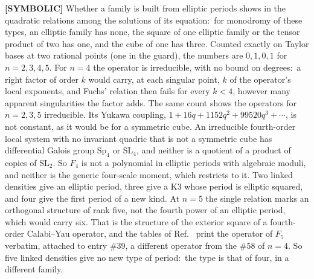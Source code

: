 \documentclass[aps,pra,twocolumn,superscriptaddress,longbibliography]{revtex4-2}
\begin{document}
\textbf{[SYMBOLIC]} Whether a family is built from elliptic periods shows
in the quadratic relations among the solutions of its equation:\ for
monodromy of these types, an elliptic family has none, the square of
one elliptic family or the tensor product of two has one, and the cube of
one has three.  Counted
exactly on Taylor bases at two rational points (one in the guard), the
numbers are
$0,1,0,1$ for $n=2,3,4,5$.  For $n=4$ the operator is irreducible, with
no bound on degrees:\ a right factor of order $k$ would carry, at each
singular point, $k$ of the operator's local exponents, and Fuchs' relation
then fails for every $k<4$, however many apparent singularities the factor
adds.  The same count shows the operators for $n=2,3,5$ irreducible.  Its
Yukawa coupling,
$1+16q+1152q^2+99520q^3+\cdots$, is not constant, as it would be for a
symmetric cube.  An irreducible fourth-order local system with no invariant
quadric that is not a symmetric cube has differential Galois group $\mathrm{Sp}_4$ or $\mathrm{SL}_4$,
and neither is a quotient of a product of copies of $\mathrm{SL}_2$.  So
$F_4$ is not a polynomial in elliptic periods with algebraic moduli, and
neither is the generic four-scale moment, which restricts to it.  Two
linked densities give an elliptic period, three give a K3 whose period is
elliptic squared, and four give the first period of a new kind.  At $n=5$
the single relation marks an orthogonal structure of rank five, not the
fourth power of an elliptic period, which would carry six.  That is the
structure of the exterior square of a fourth-order Calabi--Yau operator,
and the tables of Ref.~\cite{aesz2005} print the operator of $F_5$
verbatim, attached to entry \#39, a different operator from the \#58 of
$n=4$.  So five linked densities give no new type of period:\ the type is
that of four, in a different family.
\end{document}

